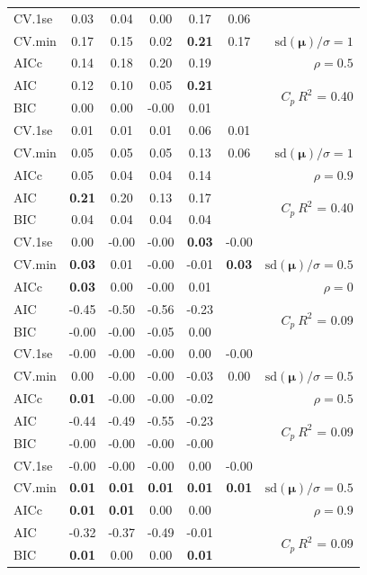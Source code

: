 \documentclass[12pt]{article}
\newcommand{\mr}[1]{\mathrm{#1}}
\newcommand{\bm}[1]{\mathbf{#1}}
\begin{document}
\begin{table}[p]
\begin{center}
\begin{tabular}{l*{5}{c}|r}
CV.1se & 0.03 & 0.04 & 0.00 & 0.17 & 0.06 &\\
CV.min & 0.17 & 0.15 & 0.02 & {\bf 0.21} & 0.17 &  $\mr{sd}(\bm{\mu})/\sigma=1$ \\
AICc & 0.14 & 0.18 & 0.20 & 0.19 & & $\rho=0.5$ \\
AIC & 0.12 & 0.10 & 0.05 & {\bf 0.21} & & \multirow{2}{*}{$C_p ~ R^2$ = 0.40} \\
BIC & 0.00 & 0.00 & -0.00 & 0.01 & & \\
 \hline 
CV.1se & 0.01 & 0.01 & 0.01 & 0.06 & 0.01 &\\
CV.min & 0.05 & 0.05 & 0.05 & 0.13 & 0.06 &  $\mr{sd}(\bm{\mu})/\sigma=1$ \\
AICc & 0.05 & 0.04 & 0.04 & 0.14 & & $\rho=0.9$ \\
AIC & {\bf 0.21} & 0.20 & 0.13 & 0.17 & & \multirow{2}{*}{$C_p ~ R^2$ = 0.40} \\
BIC & 0.04 & 0.04 & 0.04 & 0.04 & & \\
 \hline 
CV.1se & 0.00 & -0.00 & -0.00 & {\bf 0.03} & -0.00 &\\
CV.min & {\bf 0.03} & 0.01 & -0.00 & -0.01 & {\bf 0.03} &  $\mr{sd}(\bm{\mu})/\sigma=0.5$ \\
AICc & {\bf 0.03} & 0.00 & -0.00 & 0.01 & & $\rho=0$ \\
AIC & -0.45 & -0.50 & -0.56 & -0.23 & & \multirow{2}{*}{$C_p ~ R^2$ = 0.09} \\
BIC & -0.00 & -0.00 & -0.05 & 0.00 & & \\
 \hline 
CV.1se & -0.00 & -0.00 & -0.00 & 0.00 & -0.00 &\\
CV.min & 0.00 & -0.00 & -0.00 & -0.03 & 0.00 &  $\mr{sd}(\bm{\mu})/\sigma=0.5$ \\
AICc & {\bf 0.01} & -0.00 & -0.00 & -0.02 & & $\rho=0.5$ \\
AIC & -0.44 & -0.49 & -0.55 & -0.23 & & \multirow{2}{*}{$C_p ~ R^2$ = 0.09} \\
BIC & -0.00 & -0.00 & -0.00 & -0.00 & & \\
 \hline 
CV.1se & -0.00 & -0.00 & -0.00 & 0.00 & -0.00 &\\
CV.min & {\bf 0.01} & {\bf 0.01} & {\bf 0.01} & {\bf 0.01} & {\bf 0.01} &  $\mr{sd}(\bm{\mu})/\sigma=0.5$ \\
AICc & {\bf 0.01} & {\bf 0.01} & 0.00 & 0.00 & & $\rho=0.9$ \\
AIC & -0.32 & -0.37 & -0.49 & -0.01 & & \multirow{2}{*}{$C_p ~ R^2$ = 0.09} \\
BIC & {\bf 0.01} & 0.00 & 0.00 & {\bf 0.01} & & \\
 \hline 
\end{tabular}
\end{center}
\vspace{-1cm}
\end{table}
\end{document}
